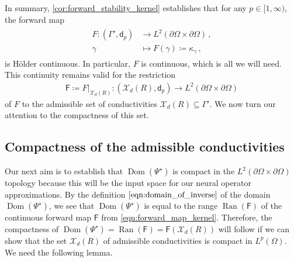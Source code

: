 \documentclass[pdflatex,sn-mathphys-num]{sn-jnl-preprint}
\newcommand{\cX}{\mathcal{X}}
\newcommand{\sfF}{\mathsf{F}}
\newcommand{\sfd}{\mathsf{d}}
\newcommand{\pOmega}{{\partial\Omega}}
\newcommand{\defeq}{\coloneqq} %
\DeclareMathOperator{\image}{Ran} %
\DeclareMathOperator{\domain}{Dom} %
\theoremstyle{thmstyleone}%
\theoremstyle{thmstyletwo}%
\theoremstyle{thmstylethree}%
\numberwithin{equation}{section}
\numberwithin{theorem}{section}
\begin{document}
In summary, \cref{cor:forward_stability_kernel} establishes that for any $p\in [1,\infty)$, the forward map 
\begin{align}\label{eqn:forward_map_kernel_bigger}
\begin{split}
    F\colon (\Gamma',\sfd_p)&\to L^2(\pOmega\times\pOmega)\,,\\
    \gamma&\mapsto F(\gamma)\defeq \kappa_\gamma\,,
\end{split}
\end{align}
is H\"older continuous. In particular, $F$ is continuous, which is all we will need. This continuity remains valid for the restriction
\begin{align}\label{eqn:forward_map_kernel}
    \sfF \defeq F|_{\cX_d(R)}\colon  (\cX_d(R),\sfd_p)\to L^2(\pOmega\times\pOmega)
\end{align}
of $F$ to the admissible set of conductivities $\cX_d(R)\subseteq \Gamma'$. We now turn our attention to the compactness of this set.

\subsection{Compactness of the admissible conductivities}\label{sec:approx_compactness}
Our next aim is to establish that $\domain(\Psi^\star)$ is compact in the $L^2(\pOmega\times\pOmega)$ topology because this will be the input space for our neural operator approximations. By the definition $\eqref{eqn:domain_of_inverse}$ of the domain $\domain(\Psi^\star)$, we see that $\domain(\Psi^\star)$ is equal to the range $\image(\sfF)$ of the continuous forward map $\sfF$ from \eqref{eqn:forward_map_kernel}. Therefore, the compactness of $\domain(\Psi^\star)=\image(\sfF)=\sfF(\cX_d(R))$ will follow if we can show that the set $\cX_d(R)$ of admissible conductivities is compact in $L^p(\Omega)$. We need the following lemma.
\end{document}
